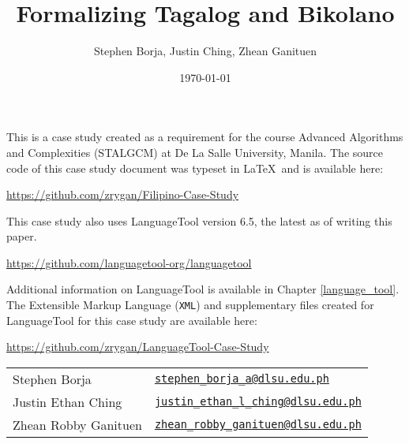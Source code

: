 \documentclass[12pt]{book}
\title{Formalizing Tagalog and Bikolano}
\author{Stephen Borja, Justin Ching, Zhean Ganituen}
\date{\today}
\begin{document}
\maketitle

This is a case study created as a requirement for the course Advanced Algorithms and Complexities (STALGCM) at De La Salle University, Manila. The source code of this case study document was typeset in \LaTeX\, and is available here:

\begin{center}
  \url{https://github.com/zrygan/Filipino-Case-Study}
\end{center}

This case study also uses LanguageTool version 6.5, the latest as of writing this paper. 

\begin{center}
    \url{https://github.com/languagetool-org/languagetool} 
\end{center}

Additional information on LanguageTool is available in Chapter \ref{language_tool}. The Extensible Markup Language  (\texttt{XML}) and supplementary files created for LanguageTool for this case study are available here:

\label{languageTool_implementation}
\begin{center}
  \url{https://github.com/zrygan/LanguageTool-Case-Study}
\end{center}

\vspace*{\fill}

\begin{tabular}{l l}
  Stephen Borja        & \href{mailto:stephen_borja_a@dlsu.edu.ph}{\texttt{stephen\_borja\_a@dlsu.edu.ph}}            \\
  Justin Ethan Ching   & \href{mailto:justin_ethan_l_ching@dlsu.edu.ph}{\texttt{justin\_ethan\_l\_ching@dlsu.edu.ph}} \\
  Zhean Robby Ganituen & \href{mailto:zhean_robby_ganituen@dlsu.edu.ph}{\texttt{zhean\_robby\_ganituen@dlsu.edu.ph}}  \\
\end{tabular}

\tableofcontents
\lstlistoflistings








\printbibliography
\end{document}
